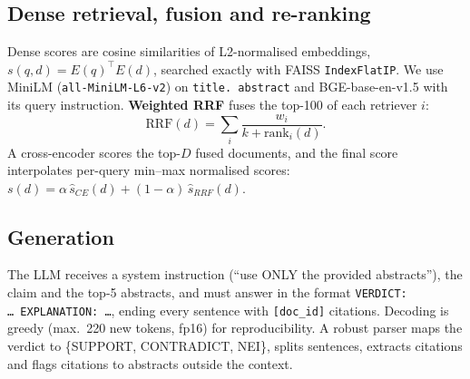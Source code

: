 \documentclass[conference]{IEEEtran}
\begin{document}
\subsection{Dense retrieval, fusion and re-ranking}
Dense scores are cosine similarities of L2-normalised embeddings, $s(q,d)=E(q)^{\top}E(d)$, searched exactly with FAISS
\texttt{IndexFlatIP}. We use MiniLM (\texttt{all-MiniLM-L6-v2}) on \texttt{title.\ abstract} and BGE-base-en-v1.5
\cite{xiao2024cpack} with its query instruction. \textbf{Weighted RRF} \cite{cormack2009rrf} fuses the top-100 of each
retriever $i$:
\begin{equation}
\mathrm{RRF}(d)=\sum_i \frac{w_i}{k+\mathrm{rank}_i(d)}.
\end{equation}
A cross-encoder scores the top-$D$ fused documents, and the final score interpolates per-query min--max normalised scores:
$s(d)=\alpha\,\hat{s}_{CE}(d)+(1-\alpha)\,\hat{s}_{RRF}(d)$.

\subsection{Generation}
The LLM receives a system instruction (``use ONLY the provided abstracts''), the claim and the top-5 abstracts, and must
answer in the format \texttt{VERDICT: \ldots\ EXPLANATION: \ldots}, ending every sentence with \texttt{[doc\_id]}
citations. Decoding is greedy (max.\ 220 new tokens, fp16) for reproducibility. A robust parser maps the verdict to
\{SUPPORT, CONTRADICT, NEI\}, splits sentences, extracts citations and flags citations to abstracts outside the context.
\end{document}
